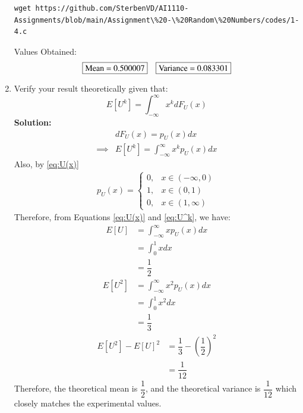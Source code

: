 \documentclass[journal,12pt,onecolumn]{IEEEtran}
\numberwithin{equation}{section}
\renewcommand\thesection{\arabic{section}}
\providecommand{\sbrak}[1]{\ensuremath{{}\left[#1\right]}}
\providecommand{\brak}[1]{\ensuremath{\left(#1\right)}}
\newcommand{\solution}{\noindent \textbf{Solution: }}
\begin{document}
\begin{enumerate}[label=\thesection.\arabic*,ref=\thesection.\theenumi]
          \begin{lstlisting}
wget https://github.com/SterbenVD/AI1110-Assignments/blob/main/Assignment\%20-\%20Random\%20Numbers/codes/1-4.c
            \end{lstlisting}
          Values Obtained:
          \begin{align}
               & \fbox{Mean =  0.500007}
               & \fbox{Variance = 0.083301}
          \end{align}
    \item Verify your result theoretically given that:
          \begin{equation}
              E\sbrak{U^k} = \int_{-\infty}^{\infty}x^kdF_{U}(x)
          \end{equation}
          \solution
          \begin{align}
                       & dF_U(x) = p_U(x) dx
              \\
              \label{eq:U^k}
              \implies & E[U^k] = \int_{-\infty}^{\infty}x^k p_U(x) dx
          \end{align}
          Also, by \eqref{eq:U(x)}
          \begin{align}
              p_U(x) =
              \begin{cases}
                  0, & x \in (-\infty,0)
                  \\
                  1, & x \in (0,1)
                  \\
                  0, & x \in (1, \infty)
              \end{cases}
          \end{align}
          Therefore, from Equations \ref{eq:U(x)} and \ref{eq:U^k}, we have:
          \begin{align}
              E[U] & =  \int_{-\infty}^{\infty}x p_U(x) dx
              \\
                   & = \int_0 ^1 x dx
              \\
                   & = \dfrac{1}{2}
          \end{align}
          \begin{align}
              E[U^2] & =  \int_{-\infty}^{\infty}x^2 p_U(x) dx
              \\
                     & = \int_0 ^1 x^2 dx
              \\
                     & = \dfrac{1}{3}
          \end{align}
          \begin{align}
              E[U^2] - E[U]^2 & = \dfrac{1}{3} - \brak{\dfrac{1}{2}}^2
              \\
                              & = \dfrac{1}{12}
          \end{align}
          Therefore, the theoretical mean is $\dfrac{1}{2}$, and the theoretical variance is $\dfrac{1}{12}$ which closely matches the experimental values.
\end{enumerate}
\end{document}
